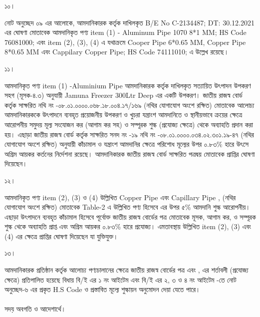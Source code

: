 \documentclass[12pt]{article}
\newcommand{\beno}{C-2134487}
\newcommand{\bedt}{30.12.2021}
\begin{document}
\thispagestyle{empty}
\noindent
\begin{minipage}[t]{0.05\linewidth}
১০।
\end{minipage}
\begin{minipage}[t]{0.95\linewidth}
নোট অনুচ্ছেদ ০৯ এর আলোকে,
আমদানিকারক {\jeal} কর্তৃক
দাখিলকৃত B/E No {\beno}; DT: {\bedt}
এর ঘোষণা মোতাবেক আমদানিকৃত পণ্য
item (1) - Aluminum Pipe 1070 8*1 MM; HS Code 76081000; {\cpcsso} এবং item
(2), (3), (4) এ যথাক্রমে Cooper Pipe 6*0.65 MM, Copper Pipe 8*0.65 MM এবং Cappilary Copper Pipe; HS Code 74111010; {\cpcfzn} এ উল্লেখ রয়েছে।
\\
\end{minipage}
\begin{minipage}[t]{0.05\linewidth}
১১।
\end{minipage}
\begin{minipage}[t]{0.95\linewidth}
আমদানিকৃত পণ্য item (1) -Aluminium Pipe আমদানিকারক কর্তৃক দাখিলকৃত সত্যায়িত উৎপাদন
উপকরণ সহগ (মূসক-৪.৩) অনুযায়ী
Jamuna Freezer 300Ltr Deep এর একটি উপকরণ। জাতীয় রাজস্ব বোর্ড কর্তৃক সাক্ষরিত নথি নং -০৮.০১.০০০০.০৬৮.১৮.০০৪.১৭/১৬৯ (নথির যোগাযোগ অংশে রক্ষিত) মোতাবেক আলোচ্য আমদানিকারককে
উৎপাদনে ব্যবহৃত প্রয়োজনীয় উপকরণ ও খুচরা যন্ত্রাংশ আমদানিতে ও স্থানীয়ভাবে ক্রয়ের ক্ষেত্রে আরোপনীয় সমুদয় মূল্য সংযোজন কর (আগাম কর সহ) ও সম্পূরক শুল্ক (প্রযোজ্য ক্ষেত্রে) থেকে অব্যাহতি প্রদান করা হয়।
এছাড়া
জাতীয় রাজস্ব বোর্ড কর্তৃক সাক্ষরিত সনদ নং -১৯ নথি নং -০৮.০১.০০০০.০৩৪.০২.৩০১.১৯-৪৭ (নথির যোগাযোগ অংশে রক্ষিত)
অনুযায়ী কাঁচামাল ও যন্ত্রাংশ আমদানির ক্ষেত্রে পরিশোধ মূল্যের উপর ০.৮৩\% হারে উৎসে অগ্রিম আয়কর কর্তনের নির্দেশনা রয়েছে।
আমদানিকারক জাতীয় রাজস্ব বোর্ড সাক্ষরিত পত্রদ্বয় মোতাবেক {\cpcsso} প্রাপ্তির ঘোষণা দিয়েছেন।
\\
\end{minipage}
\begin{minipage}[t]{0.05\linewidth}
১২।
\end{minipage}
\begin{minipage}[t]{0.95\linewidth}
আমদানিকৃত পণ্য item (2), (3) ও (4) উল্লিখিত Copper Pipe এবং Capillary Pipe {\srooof}, {\srooofd} (নথির যোগাযোগ অংশে রক্ষিত) মোতাবেক Table-2 এ উল্লিখিত পণ্য হিসেবে এর উপর ৫\% আমদানি শুল্ক আরোপনীয়। এছাড়া উৎপাদনে ব্যবহৃত
কাঁচামাল হিসেবে পূর্বোক্ত জাতীয় রাজস্ব বোর্ডের পত্র মোতাবেক মূসক, আগাম কর, ও সম্পূরক শুল্ক থেকে অব্যাহতি প্রাপ্ত এবং অগ্রিম আয়কর ০.৮৩\% হারে প্রযোজ্য। এমতাবস্থায় উল্লিখিত item (2), (3) এবং (4) এর ক্ষেত্রে {\cpcfzn} প্রাপ্তির ঘোষণা দিয়েছেন যা যুক্তিযুক্ত।
\\
\end{minipage}
\begin{minipage}[t]{0.05\linewidth}
১৩।
\end{minipage}
\begin{minipage}[t]{0.95\linewidth}
আমদানিকারক প্রতিষ্ঠান কর্তৃক
আলোচ্য পণ্যচালানের ক্ষেত্রে
জাতীয় রাজস্ব বোর্ডের পত্র
এবং {\srooof}, {\srooofd}
এর শর্তাবলী (প্রযোজ্য ক্ষেত্রে) প্রতিপালিত হয়েছে
বিধায় 
বি/ই এর ১ নং আইটেম
{\cpcsso}
এবং
বি/ই এর ২, ৩ ও ৪ নং আইটেম
{\cpcfzn} -তে নোট অনুচ্ছেদ-৬ এর প্রকৃত H.S Code
ও প্রস্তাবিত মূল্যে শুল্কায়ন অনুমোদন দেয়া যেতে পারে।
\\
\\
সদয় অবগতি ও আদেশার্থে।
\end{minipage}
\end{document}
